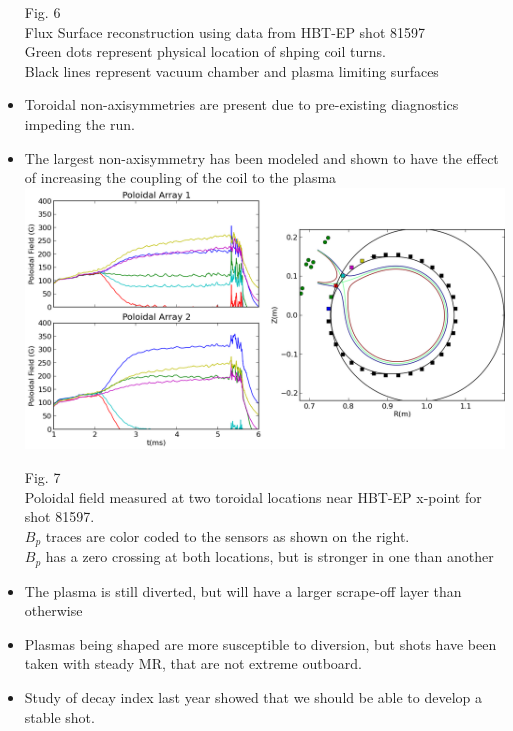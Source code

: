 \documentclass{article}
\begin{document}
\begin{multicols}{5}
\begin{itemize}
\begin{center}
Fig. 6\\
Flux Surface reconstruction using data from HBT-EP shot 81597\\
Green dots represent physical location of shping coil turns.\\
Black lines represent vacuum chamber and plasma limiting surfaces\\
\end{center}
\vspace{.25in}
\item Toroidal non-axisymmetries are present due to pre-existing diagnostics impeding the run.
\item The largest non-axisymmetry has been modeled and shown to have the effect of increasing the coupling of the coil to the plasma\\
\vspace{.25in}
\includegraphics[width=0.9\columnwidth]{poloidal_field_cancellation_APS_2013.png}
\begin{center}
Fig. 7\\
Poloidal field measured at two toroidal locations near HBT-EP x-point for shot 81597.\\
$B_p$ traces are color coded to the sensors as shown on the right.\\
$B_p$ has a zero crossing at both locations, but is stronger in one than another\\
\end{center}
\item The plasma is still diverted, but will have a larger scrape-off layer than otherwise
\item Plasmas being shaped are more susceptible to diversion, but shots have been taken with steady MR, that are not extreme outboard.
\item Study of decay index last year showed that we should be able to develop a stable shot.

\end{itemize}
\end{multicols}
\end{document}
